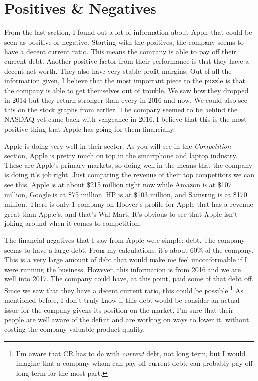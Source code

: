 \documentclass[12pt,a4paper,titlepage]{article}
\begin{document}
\newpage

\section{Positives \& Negatives}
From the last section, I found out a lot of information about Apple that could
be seen as positive or negative. Starting with the positives, the company seems
to have a decent current ratio. This means the company is able to pay off their
current debt. Another positive factor from their performance is that they have
a decent net worth. They also have very stable profit margins. Out of all the
information given, I believe that the most important piece to the puzzle is that
the company is able to get themselves out of trouble. We saw how they dropped in
2014 but they return stronger than every in 2016 and now. We could also see this
on the stock graphs from earlier. The company seemed to be behind the NASDAQ yet
came back with vengeance in 2016. I believe that this is the most positive thing
that Apple has going for them financially.

Apple is doing very well in their sector. As you will see in the
\emph{Competition} section, Apple is pretty much on top in the smartphone and
laptop industry. These are Apple's primary markets, so doing well in the means
that the company is doing it's job right. Just comparing the revenue of their
top competitors we can see this. Apple is at about \$215 million right now while
Amazon is at \$107 million, Google is at \$75 million, HP is at \$103 million,
and Samsung is at \$170 million. There is only 1 company on Hoover's profile for
Apple that has a revenue great than Apple's, and that's Wal-Mart. It's obvious
to see that Apple isn't joking around when it comes to competition.

The financial negatives that I saw from Apple were simple: debt. The company
seems to have a large debt. From my calculations, it's about 60\% of the
company. This is a very large amount of debt that would make me feel
unconformable if I were running the business. However, this information is from
2016 and we are well into 2017. The company could have, at this point, paid some
of that debt off. Since we saw that they have a decent current ratio, this could
be possible.\footnote{I'm aware that CR has to do with \emph{current} debt, not
  long term, but I would imagine that a company whom can pay off current debt,
  can probably pay off long term for the most part.} As mentioned before, I
don't truly know if this debt would be consider an actual issue for the company
givens its position on the market. I'm sure that their people are well aware of
the deficit and are working on ways to lower it, without costing the company
valuable product quality.
\end{document}
